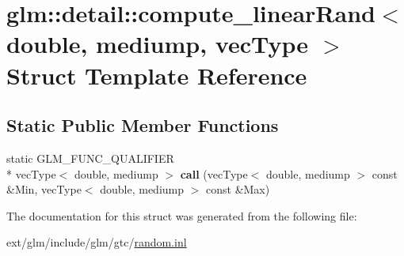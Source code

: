 \hypertarget{structglm_1_1detail_1_1compute__linear_rand_3_01double_00_01mediump_00_01vec_type_01_4}{\section{glm\-:\-:detail\-:\-:compute\-\_\-linear\-Rand$<$ double, mediump, vec\-Type $>$ Struct Template Reference}
\label{structglm_1_1detail_1_1compute__linear_rand_3_01double_00_01mediump_00_01vec_type_01_4}
}
\subsection*{Static Public Member Functions}
\begin{DoxyCompactItemize}
\item 
\hypertarget{structglm_1_1detail_1_1compute__linear_rand_3_01double_00_01mediump_00_01vec_type_01_4_a031b3fa7e6d9050f4d038c13239a71a7}{static G\-L\-M\-\_\-\-F\-U\-N\-C\-\_\-\-Q\-U\-A\-L\-I\-F\-I\-E\-R \\*
vec\-Type$<$ double, mediump $>$ {\bfseries call} (vec\-Type$<$ double, mediump $>$ const \&Min, vec\-Type$<$ double, mediump $>$ const \&Max)}\label{structglm_1_1detail_1_1compute__linear_rand_3_01double_00_01mediump_00_01vec_type_01_4_a031b3fa7e6d9050f4d038c13239a71a7}

\end{DoxyCompactItemize}


The documentation for this struct was generated from the following file\-:\begin{DoxyCompactItemize}
\item 
ext/glm/include/glm/gtc/\hyperlink{random_8inl}{random.\-inl}\end{DoxyCompactItemize}
